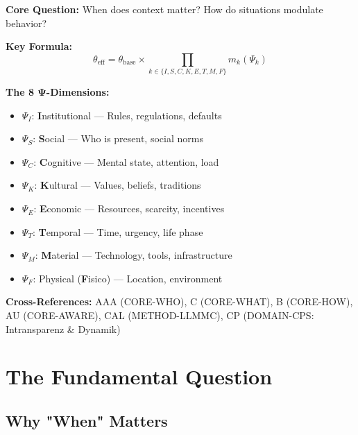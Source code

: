 \begin{tcolorbox}[colback=blue!5!white, colframe=blue!75!black,
    title=Quick Reference: CORE-WHEN]

\textbf{Core Question:} When does context matter? How do situations modulate behavior?

\textbf{Key Formula:}
\begin{equation}
\theta_{\text{eff}} = \theta_{\text{base}} \times \prod_{k \in \{I,S,C,K,E,T,M,F\}} m_k(\Psi_k)
\label{eq:when-modulation}
\end{equation}

\textbf{The 8 Ψ-Dimensions:}
\begin{itemize}[nosep]
\item $\Psi_I$: \textbf{I}nstitutional --- Rules, regulations, defaults
\item $\Psi_S$: \textbf{S}ocial --- Who is present, social norms
\item $\Psi_C$: \textbf{C}ognitive --- Mental state, attention, load
\item $\Psi_K$: \textbf{K}ultural --- Values, beliefs, traditions
\item $\Psi_E$: \textbf{E}conomic --- Resources, scarcity, incentives
\item $\Psi_T$: \textbf{T}emporal --- Time, urgency, life phase
\item $\Psi_M$: \textbf{M}aterial --- Technology, tools, infrastructure
\item $\Psi_F$: Physical (\textbf{F}isico) --- Location, environment
\end{itemize}

\textbf{Cross-References:}
AAA (CORE-WHO), C (CORE-WHAT), B (CORE-HOW), AU (CORE-AWARE), CAL (METHOD-LLMMC), CP (DOMAIN-CPS: Intransparenz \& Dynamik)

\end{tcolorbox}


\section{The Fundamental Question}
\label{sec:when-fundamental}

\subsection{Why "When" Matters}

